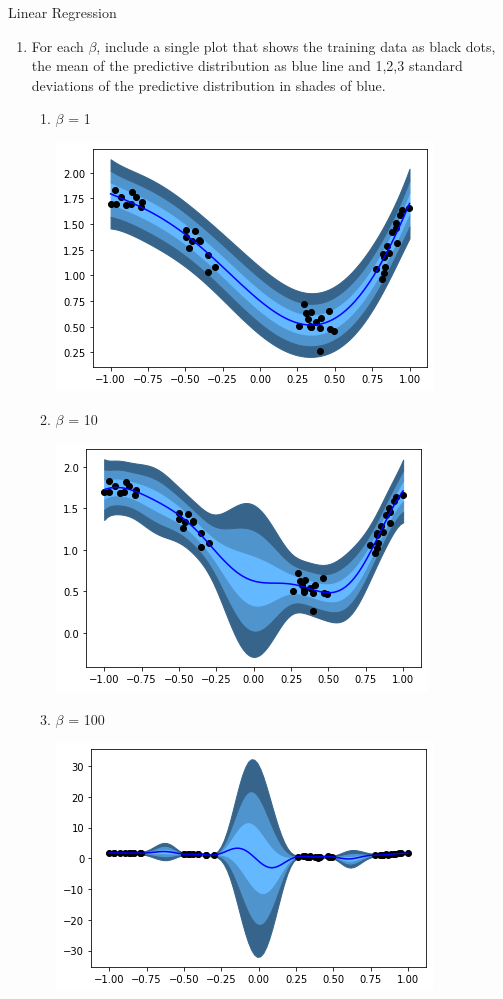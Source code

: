 \begin{task}{Linear Regression}
\begin{subtask}
\begin{enumerate}
\begin{enumerate}
\begin{enumerate}
\end{enumerate}
\end{enumerate}
\item For each $\beta$, include a single plot that shows the training data as black dots, the mean of the predictive distribution as blue line and 1,2,3 standard deviations of the predictive distribution in shades of blue.
\begin{enumerate}
\item $\beta$ = 1
\begin{center}
\includegraphics{Figure_1f_1.png}
\end{center}
\item $\beta$ = 10
\begin{center}
\includegraphics{Figure_1f_10.png}
\end{center}
\item $\beta$ = 100
\begin{center}
\includegraphics{Figure_1f_100.png}

\end{center}
\end{enumerate}
\end{enumerate}
\end{subtask}
\end{task}
